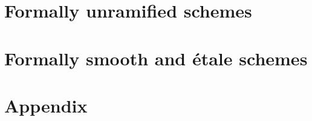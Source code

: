 \documentclass{../util/zariski}
\begin{document}
\section{Formally unramified schemes}


\section{Formally smooth and étale schemes}


\pagebreak
\appendix
\section*{Appendix}


\printindex

\printbibliography
\end{document}
